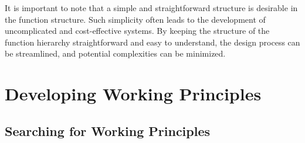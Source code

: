 It is important to note that a simple and straightforward structure is desirable in the function structure. Such simplicity often leads to the development of uncomplicated and cost-effective systems. By keeping the structure of the function hierarchy straightforward and easy to understand, the design process can be streamlined, and potential complexities can be minimized.

\section{Developing Working Principles}

\subsection{Searching for Working Principles}

